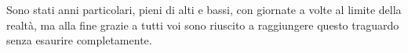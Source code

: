 \bigskip

Sono stati anni particolari, pieni di alti e bassi, con giornate a volte al limite della realtà, ma alla fine grazie a tutti voi sono riuscito a raggiungere questo traguardo senza esaurire completamente.


